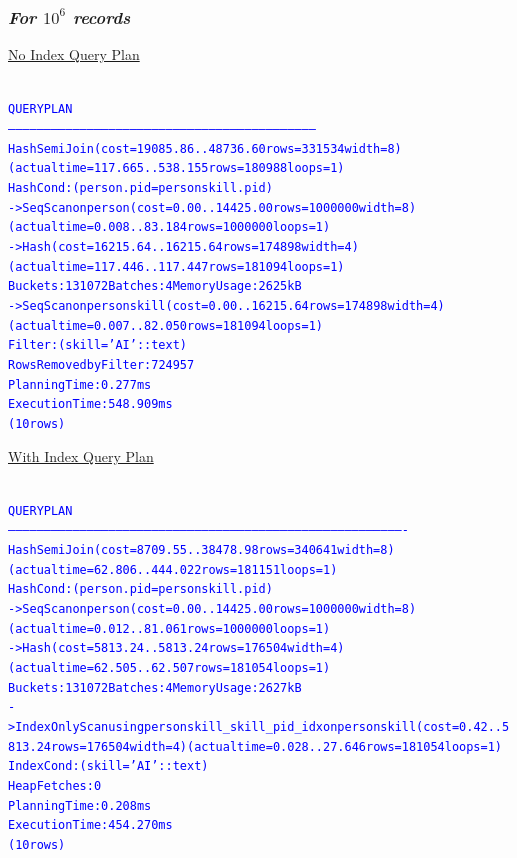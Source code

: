 \documentclass{article}
\begin{document}
    \subsubsection*{\emph{For $10^6$ records}}
    \underline{No Index Query Plan}
    \begin{center}
      {\tiny
      \begin{alltt}
      \textcolor{blue}{
        QUERY PLAN                                                           
        --------------------------------------------------------------------------------------------------------------------------------
         Hash Semi Join  (cost=19085.86..48736.60 rows=331534 width=8) (actual time=117.665..538.155 rows=180988 loops=1)
           Hash Cond: (person.pid = personskill.pid)
           ->  Seq Scan on person  (cost=0.00..14425.00 rows=1000000 width=8) (actual time=0.008..83.184 rows=1000000 loops=1)
           ->  Hash  (cost=16215.64..16215.64 rows=174898 width=4) (actual time=117.446..117.447 rows=181094 loops=1)
                 Buckets: 131072  Batches: 4  Memory Usage: 2625kB
                 ->  Seq Scan on personskill  (cost=0.00..16215.64 rows=174898 width=4) (actual time=0.007..82.050 rows=181094 loops=1)
                       Filter: (skill = 'AI'::text)
                       Rows Removed by Filter: 724957
         Planning Time: 0.277 ms
         Execution Time: 548.909 ms
        (10 rows)
       }
      \end{alltt}
      }
    \end{center}
    \underline{With Index Query Plan}
    \begin{center}
      {\tiny
      \begin{alltt}
      \textcolor{blue}{
        QUERY PLAN                                                                              
        ----------------------------------------------------------------------------------------------------------------------------------------------------------------------
         Hash Semi Join  (cost=8709.55..38478.98 rows=340641 width=8) (actual time=62.806..444.022 rows=181151 loops=1)
           Hash Cond: (person.pid = personskill.pid)
           ->  Seq Scan on person  (cost=0.00..14425.00 rows=1000000 width=8) (actual time=0.012..81.061 rows=1000000 loops=1)
           ->  Hash  (cost=5813.24..5813.24 rows=176504 width=4) (actual time=62.505..62.507 rows=181054 loops=1)
                 Buckets: 131072  Batches: 4  Memory Usage: 2627kB
                 ->  Index Only Scan using personskill_skill_pid_idx on personskill  (cost=0.42..5813.24 rows=176504 width=4) (actual time=0.028..27.646 rows=181054 loops=1)
                       Index Cond: (skill = 'AI'::text)
                       Heap Fetches: 0
         Planning Time: 0.208 ms
         Execution Time: 454.270 ms
        (10 rows)
       }
      \end{alltt}
      }
    \end{center}
\end{document}
